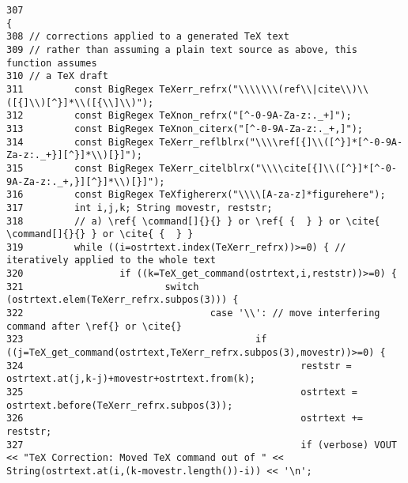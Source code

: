 \footnotesize\begin{verbatim}307                                                                       {
308 // corrections applied to a generated TeX text
309 // rather than assuming a plain text source as above, this function assumes
310 // a TeX draft
311         const BigRegex TeXerr_refrx("\\\\\\\(ref\\|cite\\)\\([{]\\)[^}]*\\([{\\]\\)");
312         const BigRegex TeXnon_refrx("[^-0-9A-Za-z:._+]");
313         const BigRegex TeXnon_citerx("[^-0-9A-Za-z:._+,]");
314         const BigRegex TeXerr_reflblrx("\\\\ref[{]\\([^}]*[^-0-9A-Za-z:._+}][^}]*\\)[}]");
315         const BigRegex TeXerr_citelblrx("\\\\cite[{]\\([^}]*[^-0-9A-Za-z:._+,}][^}]*\\)[}]");
316         const BigRegex TeXfighererx("\\\\[A-za-z]*figurehere");
317         int i,j,k; String movestr, reststr;
318         // a) \ref{ \command[]{}{} } or \ref{ {  } } or \cite{ \command[]{}{} } or \cite{ {  } }
319         while ((i=ostrtext.index(TeXerr_refrx))>=0) { // iteratively applied to the whole text
320                 if ((k=TeX_get_command(ostrtext,i,reststr))>=0) {
321                         switch (ostrtext.elem(TeXerr_refrx.subpos(3))) {
322                                 case '\\': // move interfering command after \ref{} or \cite{}
323                                         if ((j=TeX_get_command(ostrtext,TeXerr_refrx.subpos(3),movestr))>=0) {
324                                                 reststr = ostrtext.at(j,k-j)+movestr+ostrtext.from(k);
325                                                 ostrtext = ostrtext.before(TeXerr_refrx.subpos(3));
326                                                 ostrtext += reststr;
327                                                 if (verbose) VOUT << "TeX Correction: Moved TeX command out of " << String(ostrtext.at(i,(k-movestr.length())-i)) << '\n';

\end{verbatim}
